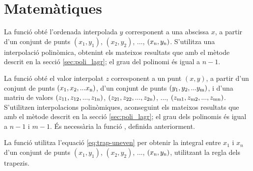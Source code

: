 


\section{Matemàtiques}

La funció  obté l'ordenada interpolada $y$ corresponent a una abscissa $x$, a partir d'un conjunt  de punts $(x_1,y_1)$, $(x_2,y_2)$, ..., $(x_\mathrm{n},y_\mathrm{n})$. S'utilitza una interpolació polinòmica, obtenint els mateixos resultats que amb el mètode descrit en la secció \vref{sec:poli_lagr}; el grau del polinomi és igual a $n-1$.




La funció  obté el valor interpolat $z$ corresponent a un punt $(x, y)$, a partir d'un conjunt de punts $(x_\mathrm{1}, x_\mathrm{2}, ... x_\mathrm{n})$, d'un conjunt de punts $(y_\mathrm{1}, y_\mathrm{2}, ... y_\mathrm{m})$, i d'una matriu de valors $(z_\mathrm{11}, z_\mathrm{12}, ..., z_\mathrm{1n})$,
$(z_\mathrm{21}, z_\mathrm{22}, ..., z_\mathrm{2n})$, ..., $(z_\mathrm{m1}, z_\mathrm{m2}, ..., z_\mathrm{mn})$. S'utilitzen  interpolacions polinòmiques, aconseguint els mateixos resultats que amb el mètode descrit en la secció \vref{sec:poli_lagr}; el grau dels polinomis és igual a $n-1$ i $m-1$.
És necessària la funció , definida anteriorment.




La funció  utilitza l'equació  \eqref{eq:trap-uneven} per obtenir la integral entre $x_1$ i $x_n$ d'un conjunt  de punts $(x_1,y_1)$, $(x_2,y_2)$, ..., $(x_\mathrm{n},y_\mathrm{n})$, utilitzant la regla dels trapezis.


